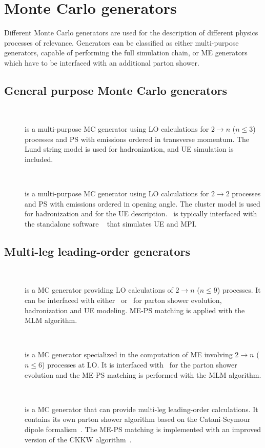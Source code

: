 \section{Monte Carlo generators}
\label{sec:MCgenerators}
Different Monte Carlo generators are used for the description of different physics processes of relevance. Generators can be classified as either multi-purpose generators, capable of performing the full simulation chain, or ME generators which have to be interfaced with an additional parton shower.

\subsection{General purpose Monte Carlo generators}
\begin{description}
  \item[\pythia~\cite{Sjostrand:2006za}] is a multi-purpose MC generator using LO calculations for $2 \rightarrow n$ ($n \leq 3$) processes and PS with emissions ordered in transverse momentum. The Lund string model is used for hadronization, and UE simulation is included.
  \item[\herwig~\cite{Corcella:2000bw}]  is a multi-purpose MC generator using LO calculations for $2 \rightarrow 2$ processes and PS with emissions ordered in opening angle. The cluster model is used for hadronization and for the UE description. \herwig\ is typically interfaced with the standalone software \jimmy~\cite{Butterworth:1996zw} that simulates UE and MPI.
\end{description}

\subsection{Multi-leg leading-order generators}
\begin{description}
\item[\alpgen~\cite{Mangano:2002ea}] is a MC generator providing LO calculations of $2 \rightarrow n$ ($n \leq 9$) processes. It can be interfaced with either \pythia\ or \herwig\ for parton shower evolution, hadronization and UE modeling. ME-PS matching is applied with the MLM algorithm.
\item[\madgraph~\cite{Alwall:2011uj}] is a MC generator specialized in the computation of ME involving $2 \rightarrow n$ ($n \leq 6$) processes at LO. It is interfaced with \pythia\ for the parton shower evolution and the ME-PS matching is performed with the MLM algorithm.
\item[\sherpa~\cite{Gleisberg:2008ta}] is a MC generator that can provide multi-leg leading-order calculations. It contains its own parton shower algorithm based on the Catani-Seymour dipole formalism~\cite{Schumann:2007mg}. The ME-PS matching is implemented with an improved version of the CKKW algorithm~\cite{Hoeche:2009rj}.
\end{description}

